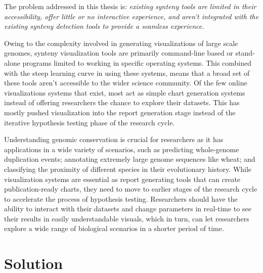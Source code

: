 The problem addressed in this thesis is: \textit{existing synteny tools are limited in their accessibility, offer little or no interactive experience, and aren't integrated with the existing synteny detection tools to provide a seamless experience.}

Owing to the complexity involved in generating visualizations of large scale genomes, synteny visualization tools are primarily command-line based or stand-alone programs limited to working in specific operating systems. This combined with the steep learning curve in using these systems, means that a broad set of these tools aren't accessible to the wider science community. Of the few online visualizations systems that exist, most act as simple chart generation systems instead of offering researchers the chance to explore their datasets. This has mostly pushed visualization into the report generation stage instead of the  iterative hypothesis testing phase of the research cycle.

Understanding genomic conservation is crucial for researchers as it has applications in a wide variety of scenarios, such as predicting whole-genome duplication events; annotating extremely large genome sequences like wheat; and classifying the proximity of different species in their evolutionary history.
While visualization systems are essential as report generating tools that can create publication-ready charts, they need to move to earlier stages of the research cycle to accelerate the process of hypothesis testing.
Researchers should have the ability to interact with their datasets and change parameters in real-time to see their results in easily understandable visuals,
which in turn, can let researchers explore a wide range of biological scenarios in a shorter period of time.

\section{Solution}


